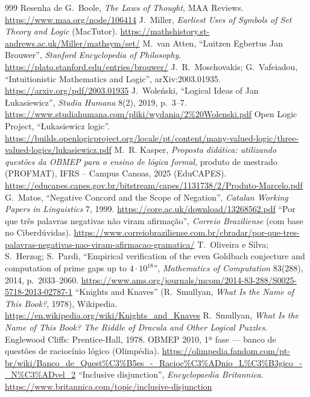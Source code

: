 \begin{thebibliography}{999}
 Resenha de G.~Boole, \emph{The Laws of Thought}, MAA Reviews. \url{https://www.maa.org/node/106414}
 J.~Miller, \emph{Earliest Uses of Symbols of Set Theory and Logic} (MacTutor). \url{https://mathshistory.st-andrews.ac.uk/Miller/mathsym/set/}
 M.~van Atten, \enquote{Luitzen Egbertus Jan Brouwer}, \emph{Stanford Encyclopedia of Philosophy}. \url{https://plato.stanford.edu/entries/brouwer/}
 J.~R.~Moschovakis; G.~Vafeiadou, \enquote{Intuitionistic Mathematics and Logic}, arXiv:2003.01935. \url{https://arxiv.org/pdf/2003.01935}
 J.~Woleński, \enquote{Logical Ideas of Jan Łukasiewicz}, \emph{Studia Humana} 8(2), 2019, p.~3--7. \url{https://www.studiahumana.com/pliki/wydania/2%20Wolenski.pdf}
 Open Logic Project, \enquote{Łukasiewicz logic}. \url{https://builds.openlogicproject.org/locale/pt/content/many-valued-logic/three-valued-logics/lukasiewicz.pdf}
 M.~R. Kasper, \emph{Proposta didática: utilizando questões da OBMEP para o ensino de lógica formal}, produto de mestrado (PROFMAT), IFRS -- Campus Canoas, 2025 (EduCAPES). \url{https://educapes.capes.gov.br/bitstream/capes/1131738/2/Produto-Marcelo.pdf}
 G.~Matos, \enquote{Negative Concord and the Scope of Negation}, \emph{Catalan Working Papers in Linguistics} 7, 1999. \url{https://core.ac.uk/download/13268562.pdf}
 \enquote{Por que três palavras negativas não viram afirmação}, \emph{Correio Braziliense} (com base no Ciberdúvidas). \url{https://www.correiobraziliense.com.br/cbradar/por-que-tres-palavras-negativas-nao-viram-afirmacao-gramatica/}
 T.~Oliveira e Silva; S.~Herzog; S.~Pardi, \enquote{Empirical verification of the even Goldbach conjecture and computation of prime gaps up to $4\cdot10^{18}$}, \emph{Mathematics of Computation} 83(288), 2014, p.~2033--2060. \url{https://www.ams.org/journals/mcom/2014-83-288/S0025-5718-2013-02787-1}
 \enquote{Knights and Knaves} (R.~Smullyan, \emph{What Is the Name of This Book?}, 1978), Wikipedia. \url{https://en.wikipedia.org/wiki/Knights_and_Knaves}
 R.~Smullyan, \emph{What Is the Name of This Book? The Riddle of Dracula and Other Logical Puzzles}. Englewood Cliffs: Prentice-Hall, 1978.
 OBMEP 2010, 1ª fase — banco de questões de raciocínio lógico (Olimpédia). \url{https://olimpedia.fandom.com/pt-br/wiki/Banco_de_Quest%C3%B5es_-_Racioc%C3%ADnio_L%C3%B3gico_-_N%C3%ADvel_2}
 \enquote{Inclusive disjunction}, \emph{Encyclopaedia Britannica}. \url{https://www.britannica.com/topic/inclusive-disjunction}

\end{thebibliography}
